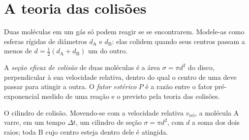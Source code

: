 \section{A teoria das colisões}

Duas moléculas em um gás só podem reagir se se encontrarem. Modele-as como esferas
rígidas de diâmetros $d_{\mathrm A}$ e $d_{\mathrm B}$: elas colidem quando seus centros passam a menos de $d =
\frac12(d_{\mathrm A} + d_{\mathrm B})$ um do outro.

\begin{definition}\label{def:b3:rate-theories:collision}
A \emph{seção eficaz de colisão} de duas moléculas
é a área $\sigma = \pi d^2$ do disco, perpendicular à sua velocidade relativa,
dentro do qual o centro de uma deve passar para atingir a outra. O
\emph{fator estérico} $P$ é a razão entre o fator
pré-exponencial medido de uma reação e o previsto pela teoria das colisões.
\end{definition}

\begin{omfigure}

{\small O cilindro de colisão. Movendo-se com a velocidade relativa $v_{\mathrm{rel}}$, a molécula A
varre, em um tempo $\Delta t$, um cilindro de seção $\sigma = \pi d^2$, com $d$ a soma dos dois
raios; toda B cujo centro esteja dentro dele é atingida.}
\end{omfigure}

